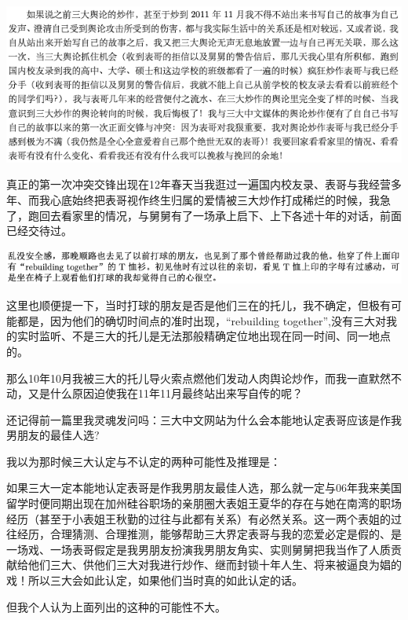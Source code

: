 \documentclass[9pt, b5paper]{article}
\begin{document}
\begin{center}
\includegraphics[width=.9\linewidth]{./pic/backups_plans_20210412_173106.png}
\end{center}

真正的第一次冲突交锋出现在12年春天当我逛过一遍国内校友录、表哥与我经营多年、而我心底始终把表哥视作终生归属的爱情被三大炒作打成稀烂的时候，我急了，跑回去看家里的情况，与舅舅有了一场承上启下、上下各述十年的对话，前面已经交待过。

\begin{center}
\includegraphics[width=.9\linewidth]{./pic/backups_plans_20210412_173313.png}
\end{center}

这里也顺便提一下，当时打球的朋友是否是他们三在的托儿，我不确定，但极有可能都是，因为他们的确切时间点的准时出现，“rebuilding together”,没有三大对我的实时监听、不是三大的托儿是无法那般精确定位地出现在同一时间、同一地点的。 

那么10年10月我被三大的托儿导火索点燃他们发动人肉舆论炒作，而我一直默然不动，又是什么原因迫使我在11年11月最终站出来写自传的呢？

还记得前一篇里我灵魂发问吗：三大中文网站为什么会本能地认定表哥应该是作我男朋友的最佳人选?

我以为那时候三大认定与不认定的两种可能性及推理是：

如果三大一定本能地认定表哥是作我男朋友最佳人选，那么就一定与06年我来美国留学时便同期出现在加州硅谷职场的亲朋圈大表姐王夏华的存在与她在南湾的职场经历（甚至于小表姐王秋勤的过往与此都有关系）有必然关系。这一两个表姐的过往经历，合理猜测、合理推测，能够帮助三大界定表哥与我的恋爱必定是假的、是一场戏、一场表哥假定是我男朋友扮演我男朋友角实、实则舅舅把我当作了人质贡献给他们三大、供他们三大对我进行炒作、继而封锁十年人生、将来被逼良为娼的戏！所以三大会如此认定，如果他们当时真的如此认定的话。

但我个人认为上面列出的这种的可能性不大。
\end{document}
